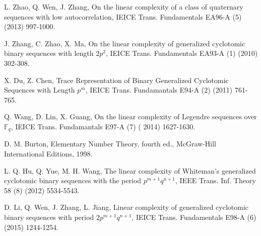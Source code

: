\documentclass{mcom-l}
\theoremstyle{definition}
\numberwithin{equation}{section}
\begin{document}
\begin{thebibliography}{99}
 L. Zhao, Q. Wen,  J. Zhang,   On the linear complexity of a class of quaternary sequences with low autocorrelation, IEICE Trans. Fundamentals EA96-A (5) (2013) 997-1000.

 J. Zhang, C. Zhao,  X. Ma,  On the linear complexity of generalized cyclotomic binary sequences with length $ 2p^{2} $, IEICE Trans. Fundamentals EA93-A (1) (2010) 302-308.

 X. Du,  Z. Chen,  Trace Representation of Binary Generalized Cyclotomic Sequences with Length $ p^{m} $, IEICE Trans. Fundamantals E94-A (2) (2011) 761-765.

 Q. Wang, D. Lin,  X. Guang, On the linear complexity of Legendre sequences over $ \mathbb{F}_{q} $, IEICE Trans. Fundamantals E97-A (7) ( 2014) 1627-1630.

 D. M. Burton, Elementary Number Theory, fourth ed., McGraw-Hill International Editions, 1998.

L. Q. Hu, Q. Yue,  M. H. Wang, The linear complexity of Whiteman\textquoteright s generalized cyclotomic binary sequences with the period $ p^{m+1}q^{n+1} $, IEEE Trans. Inf. Theory 58 (8) (2012) 5534-5543.

D. Li, Q. Wen, J. Zhang,  L. Jiang, Linear complexity of generalized cyclotomic binary sequences with period $ 2p^{m+1}q^{n+1} $, IEICE Trans. Fundamentals E98-A (6) (2015) 1244-1254.
\end{thebibliography}
\end{document}
